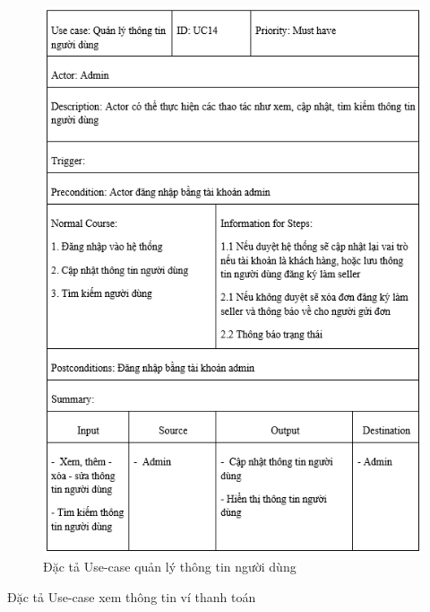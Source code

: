 \documentclass{article}
\begin{document}
{{{{{{{{{{{{{{	\begin{center}
		\begin{figure}[htp]
			\begin{center}
				\includegraphics[scale=.810]{anh24.png}
			\end{center}
			\caption{Đặc tả Use-case quản lý thông tin người dùng}
			
		\end{figure}
	\end{center}
\newpage



\newpage
{\large Đặc tả Use-case xem thông tin ví thanh toán
	
}}}}}}}}}}}}}}}
\end{document}
